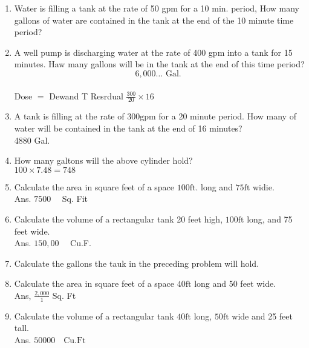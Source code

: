 \documentclass{article}
\begin{document}
\begin{enumerate}
\item Water is filling a tank at the rate of 50 gpm for a 10 min. period, How many gallons of water are contained in the tank at the end of the 10 minute time period?\\

\item A well pump is discharging water at the rate of 400 gpm into a tank for 15 minutes. Haw many gallons will be in the tank at the end of this time period?\\
$$6,000 \ldots \text { Gal. }$$\\
Dose $=$ Dewand T Resrdual $\frac{300}{20} \times 16$\\

\item A tank is filling at the rate of $300 \mathrm{gpm}$ for a 20 minute period. How many of water will be contained in the tank at the end of 16 minutes?\\
4880 Gal.\\


\item How many galtons will the above cylinder hold?\\
$100 \times 7.48=748$\\

\item Calculate the area in square feet of a space $100 \mathrm{ft}$. long and $75 \mathrm{ft}$ widie.\\
Ans. $7500 \quad$ Sq. Fit\\

\item Calculate the volume of a rectangular tank 20 feet high, $100 \mathrm{ft}$ long, and 75 feet wide.\\
Ans. $150,00 \quad$ Cu.F.\\

\item Calculate the gallons the tauk in the preceding problem will hold.\\

\item Calculate the area in square feet of a space $40 \mathrm{ft}$ long and 50 feet wide.\\
Ans, $\frac{2,000}{1}$ Sq. Ft\\

\item Calculate the volume of a rectangular tank $40 \mathrm{ft}$ long, $50 \mathrm{ft}$ wide and 25 feet tall.\\
Ans. $50000 \quad \mathrm{Cu} . \mathrm{Ft}$\\


\end{enumerate}
\end{document}
